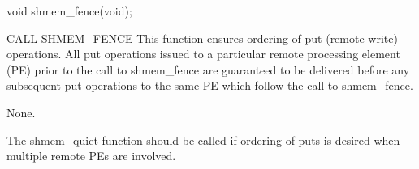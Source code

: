 \synC   %
 
 void shmem_fence(void);

\synF   %

 CALL SHMEM_FENCE
{
    This  function ensures ordering of put (remote write) operations. All
    put operations issued to a particular remote  processing element (PE)
    prior  to the call to shmem\_fence are guaranteed to be delivered before
    any subsequent put operations to the same PE which follow the  call  to
    shmem\_fence.
}
 
{
    {None.}
}


{
    The  shmem\_quiet	 function  should  be  called  if  ordering of puts is
    desired when multiple remote PEs are involved.
}
\eAPI

